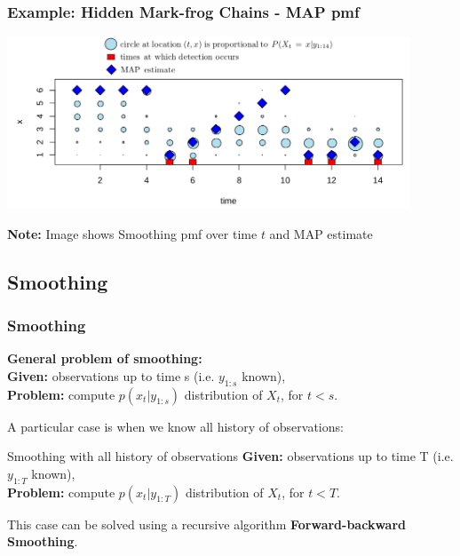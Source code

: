 \documentclass[xcolor=dvipsnames, compress]{beamer}
\begin{document}
\begin{frame}
\frametitle{Example: Hidden Mark-frog Chains - MAP pmf}

	\includegraphics[width=0.9\textwidth]{images/frog_smooth_map.png}

\textbf{Note:} Image shows Smoothing pmf over time $t$ and MAP estimate
\end{frame}



%
%

\begin{frame}
\section{Smoothing}
\frametitle{Smoothing}

\textbf{General problem of smoothing:}\\
\textbf{Given:} observations up to time s (i.e. $y_{1:s}$ known),\\
\textbf{Problem:} compute $p(x_t | y_{1:s})$ distribution of $X_t$, for $t < s$.
\vspace{0.5cm}

A particular case is when we know all history of observations:

\begin{block}{Smoothing with all history of observations}
	\textbf{Given:} observations up to time T (i.e. $y_{1:T}$ known),\\
	\textbf{Problem:} compute $p(x_t | y_{1:T})$ distribution of $X_t$, for $t < T$.
\end{block}

This case can be solved using a recursive algorithm \textbf{Forward-backward Smoothing}.

\end{frame}
\end{document}
